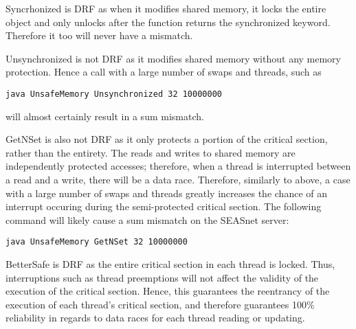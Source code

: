 Syncrhonized is DRF as when it modifies shared memory, it locks the entire object and only unlocks after the function returns the synchronized keyword. Therefore it too will never have a mismatch.

Unsynchronized is not DRF as it modifies shared memory without any memory protection. Hence a call with a large number of swaps and threads, such as 
\begin{verbatim}
java UnsafeMemory Unsynchronized 32 10000000
\end{verbatim}
will almost certainly result in a sum mismatch.

GetNSet is also not DRF as it only protects a portion of the critical section, rather than the entirety. The reads and writes to shared memory are independently protected accesses; therefore, when 
a thread is interrupted between a read and a write, there will be a data race. Therefore, similarly to above, a case with a large number of swaps and threads greatly increases the chance of an interrupt occuring during the semi-protected
critical section. The following command will likely cause a sum mismatch on the SEASnet server:
\begin{verbatim}
java UnsafeMemory GetNSet 32 10000000
\end{verbatim}

BetterSafe is DRF as the entire critical section in each thread is locked. Thus, interruptions such as thread preemptions will not affect the validity of the execution of the critical section. Hence, this guarantees the reentrancy of the execution of
each thread's critical section, and therefore guarantees 100\% reliability in regards to data races for each thread reading or updating.


